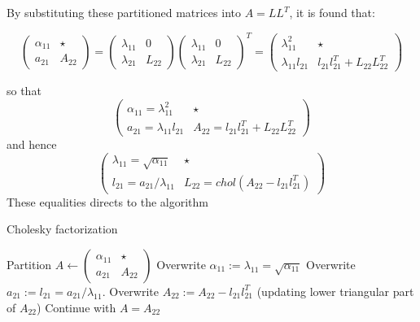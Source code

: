 By substituting these partitioned matrices into $A=LL^T$, it is found that:

\begin{equation*}
\left(
\begin{array}{c|c}
\alpha_{11}  & \star \\ \hline
a_{21} & A_{22}
\end{array}
\right)
=
\left(
\begin{array}{c|c}
\lambda_{11}  & 0 \\ \hline
\lambda_{21} & L_{22}
\end{array}\right)
\left(
\begin{array}{c|c}
\lambda_{11}  & 0 \\ \hline
\lambda_{21} & L_{22}
\end{array}
\right)^T
=
\left(
\begin{array}{c|c}
\lambda_{11}^2  & \star \\ \hline
\lambda_{11}l_{21} & l_{21}l_{21}^T+L_{22}L_{22}^T
\end{array}
\right)
\end{equation*}

so that
\begin{equation*}
	\left(
\begin{array}{c|c}
\alpha_{11}=\lambda_{11}^2  & \star \\ \hline
a_{21} = \lambda_{11}l_{21} & A_{22}=l_{21}l_{21}^T+L_{22}L_{22}^T
\end{array}
\right)
\end{equation*}
and hence
\begin{equation*}
	\left(
\begin{array}{c|c}
\lambda_{11} = \sqrt{\alpha_{11}}  & \star \\ \hline
l_{21} = a_{21}/\lambda_{11} & L_{22} = chol(A_{22}-l_{21}l_{21}^T)
\end{array}
\right)
\end{equation*}
These equalities directs to the algorithm
\begin{algorithm}[h]
  \caption{Cholesky factorization}\label{euclid}
  \begin{algorithmic}[1]
     \State Partition $A \gets
	\left(
\begin{array}{c|c}
\alpha_{11}  & \star \\ \hline
a_{21} & A_{22}
\end{array}
\right)$
	\State Overwrite $\alpha_{11}:=\lambda_{11} = \sqrt{\alpha_{11}}$
	\State Overwrite $a_{21} :=l_21 = a_{21}/\lambda_11$.
	\State Overwrite $A_{22}:=A_{22}-l_{21}l_{21}^T$ (updating lower triangular part of $A_22$)
	\State Continue with $A=A_{22}$
    \EndProcedure
  \end{algorithmic}
\end{algorithm}


